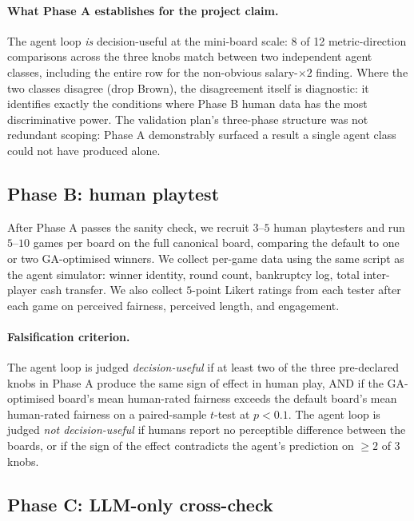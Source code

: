 \documentclass[10pt]{article}
\begin{document}
\paragraph{What Phase A establishes for the project claim.} The agent
loop \emph{is} decision-useful at the mini-board scale: 8 of 12
metric-direction comparisons across the three knobs match between two
independent agent classes, including the entire row for the
non-obvious salary-$\times 2$ finding. Where the two classes disagree
(drop Brown), the disagreement itself is diagnostic: it identifies
exactly the conditions where Phase B human data has the most
discriminative power. The validation plan's three-phase structure was
not redundant scoping: Phase A demonstrably surfaced a result a single
agent class could not have produced alone.

\subsection{Phase B: human playtest}

After Phase A passes the sanity check, we recruit $3$--$5$ human
playtesters and run $5$--$10$ games per board on the full canonical
board, comparing the default to one or two GA-optimised winners. We
collect per-game data using the same script as the agent simulator:
winner identity, round count, bankruptcy log, total inter-player cash
transfer. We also collect $5$-point Likert ratings from each tester
after each game on perceived fairness, perceived length, and engagement.

\paragraph{Falsification criterion.} The agent loop is judged
\emph{decision-useful} if at least two of the three pre-declared knobs
in Phase A produce the same sign of effect in human play, AND if the
GA-optimised board's mean human-rated fairness exceeds the default
board's mean human-rated fairness on a paired-sample $t$-test at
$p<0.1$. The agent loop is judged \emph{not decision-useful} if humans
report no perceptible difference between the boards, or if the sign of
the effect contradicts the agent's prediction on $\geq 2$ of $3$ knobs.

\subsection{Phase C: LLM-only cross-check}\label{sec:phase_c}
\end{document}
